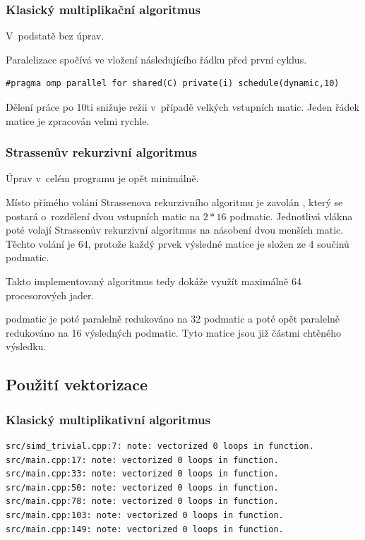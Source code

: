 \documentclass[12pt,a4paper]{article}
\begin{document}
\subsubsection{Klasický multiplikační algoritmus}

V~podstatě bez úprav.

\bigskip
Paralelizace spočívá ve vložení následujícího řádku před první cyklus.

\begin{verbatim}
#pragma omp parallel for shared(C) private(i) schedule(dynamic,10)
\end{verbatim}

\bigskip
Dělení práce po 10ti  snižuje režii v~případě velkých vstupních matic. Jeden řádek matice je zpracován velmi rychle.


\subsubsection{Strassenův rekurzivní algoritmus}

Úprav v~celém programu je opět minimálně.
\bigskip

Místo přímého volání Strassenova rekurzivního algoritmu je zavolán , který se postará o~rozdělení dvou vstupních matic na $2*16$ podmatic. Jednotlivá vlákna poté volají Strassenův rekurzivní algoritmus na násobení dvou menších matic. Těchto volání je 64, protože každý prvek výsledné matice je složen ze 4 součinů podmatic.
\bigskip

Takto implementovaný algoritmus tedy dokáže využít maximálně 64 procesorových jader.

 podmatic je poté paralelně redukováno na 32 podmatic a poté opět paralelně redukováno na 16 výsledných podmatic. Tyto matice jsou již částmi chtěného výsledku.


\subsection{Použití vektorizace}

\subsubsection{Klasický multiplikativní algoritmus}

\begin{verbatim}
src/simd_trivial.cpp:7: note: vectorized 0 loops in function.
src/main.cpp:17: note: vectorized 0 loops in function.
src/main.cpp:33: note: vectorized 0 loops in function.
src/main.cpp:50: note: vectorized 0 loops in function.
src/main.cpp:78: note: vectorized 0 loops in function.
src/main.cpp:103: note: vectorized 0 loops in function.
src/main.cpp:149: note: vectorized 0 loops in function.
\end{verbatim}
\end{document}
